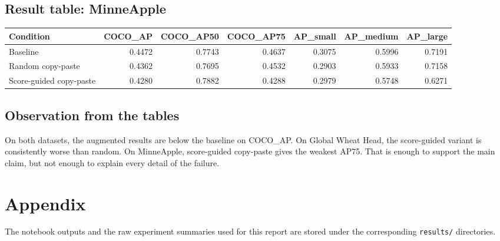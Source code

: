 \documentclass[11pt, a4paper]{article}
\begin{document}
\subsection{Result table: MinneApple}
\begin{center}
\small
\begin{tabular}{@{}lrrrrrr@{}}
\toprule
\textbf{Condition} & \textbf{COCO\_AP} & \textbf{COCO\_AP50} & \textbf{COCO\_AP75} & \textbf{AP\_small} & \textbf{AP\_medium} & \textbf{AP\_large} \\
\midrule
Baseline & 0.4472 & 0.7743 & 0.4637 & 0.3075 & 0.5996 & 0.7191 \\
Random copy-paste & 0.4362 & 0.7695 & 0.4532 & 0.2903 & 0.5933 & 0.7158 \\
Score-guided copy-paste & 0.4280 & 0.7882 & 0.4288 & 0.2979 & 0.5748 & 0.6271 \\
\bottomrule
\end{tabular}
\end{center}

\subsection{Observation from the tables}
On both datasets, the augmented results are below the baseline on COCO\_AP. On Global Wheat Head, the score-guided variant is consistently worse than random. On MinneApple, score-guided copy-paste gives the weakest AP75. That is enough to support the main claim, but not enough to explain every detail of the failure.

\section{Appendix}
The notebook outputs and the raw experiment summaries used for this report are stored under the corresponding \texttt{results/} directories.
\end{document}
